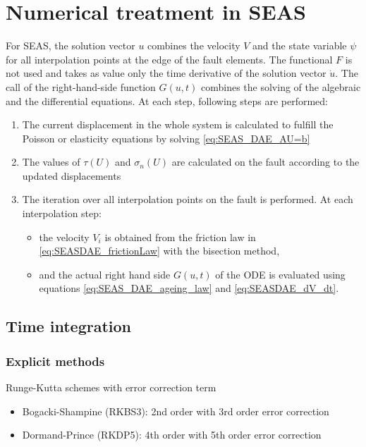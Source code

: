 \section{Numerical treatment in SEAS}
For SEAS, the solution vector $u$ combines the velocity $V$ and the state variable $\psi$ for all interpolation points at the edge of the fault elements. The functional $F$ is not used and takes as value only the time derivative of the solution vector $\dot{u}$. The call of the right-hand-side function $G(u,t)$ combines the solving of the algebraic and the differential equations. At each step, following steps are performed: 
\begin{enumerate}
    \item The current displacement in the whole system is calculated to fulfill the Poisson or elasticity equations by solving \autoref{eq:SEAS_DAE_AU=b} \\
    \item The values of $\tau(U)$ and $\sigma_n(U)$ are calculated on the fault according to the updated displacements \\
    \item The iteration over all interpolation points on the fault is performed. At each interpolation step: 
    \begin{itemize}
        \item the velocity $V_i$ is obtained from the friction law in \autoref{eq:SEASDAE_frictionLaw} with the bisection method,
        \item and the actual right hand side $G(u,t)$ of the ODE is evaluated using equations \ref{eq:SEAS_DAE_ageing_law} and \ref{eq:SEASDAE_dV_dt}.
    \end{itemize}
\end{enumerate}


\subsection{Time integration}
\subsubsection{Explicit methods}
Runge-Kutta schemes with error correction term 
\begin{itemize}
    \item Bogacki-Shampine (RKBS3): 2nd order with 3rd order error correction \\
    \item Dormand-Prince (RKDP5): 4th order with 5th order error correction 
\end{itemize}

